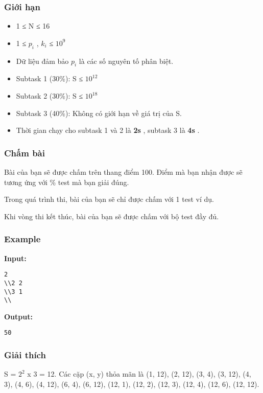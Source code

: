\subsubsection{   Giới hạn  }
\begin{itemize}
	\item     1 ≤ N ≤ 16   
	\item     1 ≤ $p_{i}$    , $k_{i}$    ≤ $10^{9}$
	\item     Dữ liệu đảm bảo $p_{i}$    là các số nguyên tố phân biệt.   
	\item     Subtask 1 (30\%): S ≤ $10^{12}$
	\item     Subtask 2 (30\%): S ≤ $10^{18}$
	\item     Subtask 3 (40\%): Không có giới hạn về giá trị của S.   
	\item     Thời gian chạy cho subtask 1 và 2 là    \textbf{     2s    }    , subtask 3 là    \textbf{     4s    }    .   
\end{itemize}

\subsubsection{   Chấm bài  }

   Bài của bạn sẽ được chấm trên thang điểm 100. Điểm mà bạn nhận được sẽ tương ứng với \% test mà bạn giải đúng.  

   Trong quá trình thi, bài của bạn sẽ chỉ được chấm với 1 test ví dụ.  

   Khi vòng thi kết thúc, bài của bạn sẽ được chấm với bộ test đầy đủ.  
\begin{itemize}
\end{itemize}
\begin{itemize}
\end{itemize}

\subsubsection{   Example  }

\textbf{    Input:   }
\begin{verbatim}
2
\\2 2
\\3 1 
\\\end{verbatim}

\textbf{    Output:   }
\begin{verbatim}
50
\end{verbatim}

\subsubsection{   Giải thích  }

   S = $2^{2}$   x 3 = 12. Các cặp (x, y) thỏa mãn là (1, 12), (2, 12), (3, 4), (3, 12), (4, 3), (4, 6), (4, 12), (6, 4), (6, 12), (12, 1), (12, 2), (12, 3), (12, 4), (12, 6), (12, 12).  
